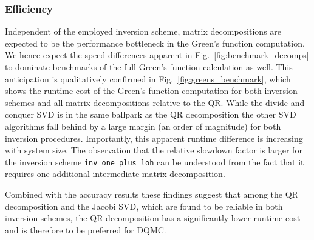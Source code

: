 \documentclass[submission, Phys]{SciPost}
\begin{document}
\subsubsection{Efficiency}

Independent of the employed inversion scheme, matrix decompositions are expected to be the performance bottleneck in the Green's function computation. We hence expect the speed differences apparent in Fig.~\ref{fig:benchmark_decomps} to dominate benchmarks of the full Green's function calculation as well. This anticipation is qualitatively confirmed in Fig.~\ref{fig:greens_benchmark}, which shows the runtime cost of the Green's function computation for both inversion schemes and all matrix decompositions relative to the QR. While the divide-and-conquer SVD is in the same ballpark as the QR decomposition the other SVD algorithms fall behind by a large margin (an order of magnitude) for both inversion procedures. Importantly, this apparent runtime difference is increasing with system size. The observation that the relative slowdown factor is larger for the inversion scheme \texttt{inv\_one\_plus\_loh} can be understood from the fact that it requires one additional intermediate matrix decomposition.

Combined with the accuracy results these findings suggest that among the QR decomposition and the Jacobi SVD, which are found to be reliable in both inversion schemes, the QR decomposition has a significantly lower runtime cost and is therefore to be preferred for DQMC.
\end{document}
